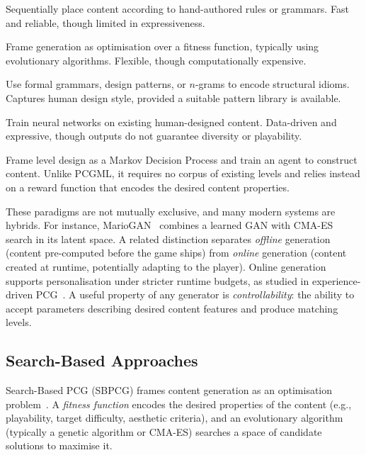 \documentclass[shortabstract, mgr, english]{iithesis}
\begin{document}
\begin{description}[style=nextline, leftmargin=1.5em]
    \item[Constructive / Rule-based] Sequentially place content according to
    hand-authored rules or grammars. Fast and reliable, though limited in
    expressiveness.
    \item[Search-based (SBPCG)] Frame generation as optimisation over a fitness
    function, typically using evolutionary algorithms. Flexible, though
    computationally expensive.
    \item[Grammar / Pattern-based] Use formal grammars, design patterns, or
    $n$-grams to encode structural idioms. Captures human design style,
    provided a suitable pattern library is available.
    \item[Machine Learning (PCGML)] Train neural networks on existing
    human-designed content. Data-driven and expressive, though outputs do not
    guarantee diversity or playability.
    \item[Reinforcement Learning (PCGRL)] Frame level design as a Markov
    Decision Process and train an agent to construct content. Unlike PCGML, it
    requires no corpus of existing levels and relies instead on a reward function that
    encodes the desired content properties.
\end{description}

These paradigms are not mutually exclusive, and many modern systems are hybrids. For
instance, MarioGAN~\citep{volz2018evolving} combines a learned GAN with CMA-ES
search in its latent space. A related distinction separates \emph{offline}
generation (content pre-computed before the game ships) from \emph{online}
generation (content created at runtime, potentially adapting to the player).
Online generation supports personalisation under stricter runtime
budgets, as studied in experience-driven
PCG~\citep{yannakakis2011experience}. A useful property of any generator is
\emph{controllability}: the ability to accept parameters describing desired
content features and produce matching levels.

\subsection{Search-Based Approaches}
\label{subsec:bg-search}

Search-Based PCG (SBPCG) frames content generation as an optimisation
problem~\citep{togelius2011search}. A \emph{fitness function} encodes the desired
properties of the content (e.g., playability, target difficulty, aesthetic
criteria), and an evolutionary algorithm (typically a genetic algorithm or
CMA-ES) searches a space of candidate solutions to maximise it.
\end{document}
